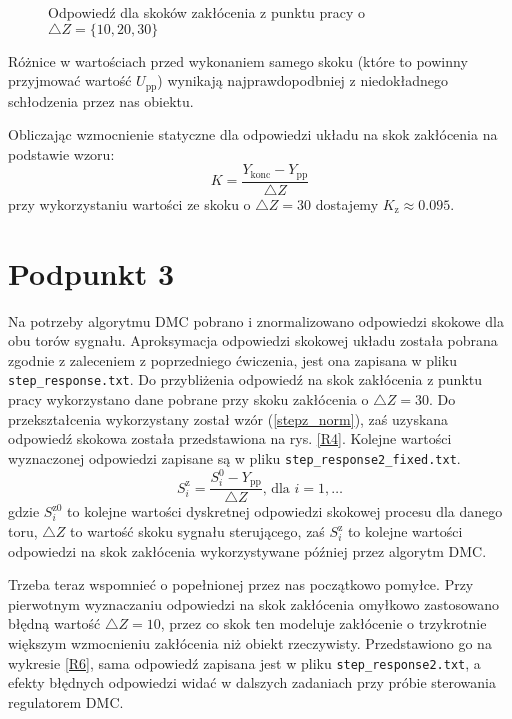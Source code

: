 \begin{figure}[ht]
\centering

\caption{Odpowiedź dla skoków zakłócenia z punktu pracy o $\triangle Z = \{10, 20, 30\}$}
\label{R2}
\end{figure}

Różnice w wartościach przed wykonaniem samego skoku (które to powinny przyjmować wartość $U_{\mathrm{pp}}$) wynikają najprawdopodbniej z niedokładnego schłodzenia przez nas obiektu.

Obliczając wzmocnienie statyczne dla odpowiedzi układu na skok zakłócenia na podstawie wzoru:
\begin{equation}
K=\frac{Y_{\mathrm{konc}}-Y_{\mathrm{pp}}}{\triangle Z}
\end{equation}
przy wykorzystaniu wartości ze skoku o $ \triangle Z = 30 $ dostajemy $K_{\mathrm{z}} \approx \num{0.095}$.


\chapter{Podpunkt 3}
Na potrzeby algorytmu DMC pobrano i znormalizowano odpowiedzi skokowe dla obu torów sygnału. Aproksymacja odpowiedzi skokowej układu została pobrana zgodnie z zaleceniem z poprzedniego ćwiczenia, jest ona zapisana w pliku \verb|step_response.txt|. Do przybliżenia odpowiedź na skok zakłócenia z punktu pracy wykorzystano dane pobrane przy skoku zakłócenia o $\triangle Z = 30$. Do przekształcenia wykorzystany został wzór (\ref{stepz_norm}), zaś uzyskana odpowiedź skokowa została przedstawiona na rys. \ref{R4}. Kolejne wartości wyznaczonej odpowiedzi zapisane są w pliku \verb+step_response2_fixed.txt+.
\begin{equation}
S_i^{\mathrm{z}} = \frac{S_i^0 - Y_{\mathrm{pp}}}{\triangle Z} \textrm{, dla } i=1,\ldots
\label{stepz_norm}
\end{equation}
gdzie $S_i^{\mathrm{z}0}$ to kolejne wartości dyskretnej odpowiedzi skokowej procesu dla danego toru, $\triangle Z$ to wartość skoku sygnału sterującego, zaś $S_i^{\mathrm{z}}$ to kolejne wartości odpowiedzi na skok zakłócenia wykorzystywane później przez algorytm DMC.

Trzeba teraz wspomnieć o popełnionej przez nas początkowo pomyłce. Przy pierwotnym wyznaczaniu odpowiedzi na skok zakłócenia omyłkowo zastosowano błędną wartość $ \triangle Z = 10 $, przez co skok ten modeluje zakłócenie o trzykrotnie większym wzmocnieniu zakłócenia niż obiekt rzeczywisty. Przedstawiono go na wykresie \ref{R6}, sama odpowiedź zapisana jest w pliku \verb|step_response2.txt|, a efekty błędnych odpowiedzi widać w dalszych zadaniach przy próbie sterowania regulatorem DMC.


